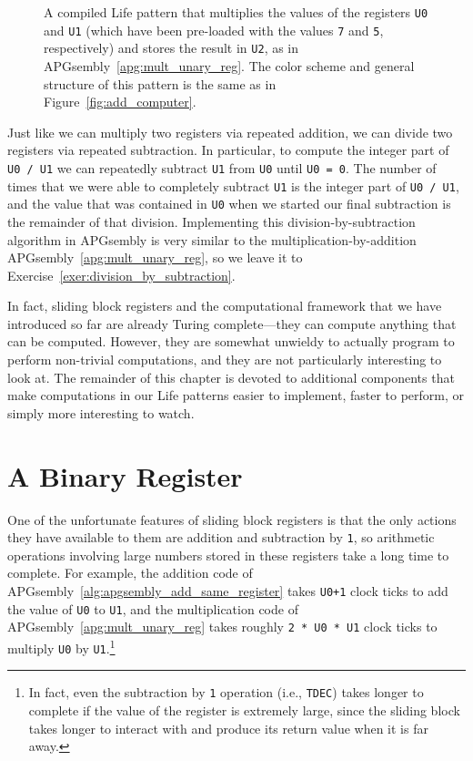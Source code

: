 \begin{figure}[!htb]
	\centering
	\caption{A compiled Life pattern that multiplies the values of the registers \texttt{U0} and \texttt{U1} (which have been pre-loaded with the values \texttt{7} and \texttt{5}, respectively) and stores the result in \texttt{U2}, as in APGsembly~\ref{apg:mult_unary_reg}. The color scheme and general structure of this pattern is the same as in Figure~\ref{fig:add_computer}.}\label{fig:mult_computer}
\end{figure}

Just like we can multiply two registers via repeated addition, we can divide two registers via repeated subtraction. In particular, to compute the integer part of \texttt{U0 / U1} we can repeatedly subtract \texttt{U1} from \texttt{U0} until \texttt{U0 = 0}. The number of times that we were able to completely subtract \texttt{U1} is the integer part of \texttt{U0 / U1}, and the value that was contained in \texttt{U0} when we started our final subtraction is the remainder of that division. Implementing this division-by-subtraction algorithm in APGsembly is very similar to the multiplication-by-addition APGsembly~\ref{apg:mult_unary_reg}, so we leave it to Exercise~\ref{exer:division_by_subtraction}.

In fact, sliding block registers and the computational framework that we have introduced so far are already Turing complete---they can compute anything that can be computed. However, they are somewhat unwieldy to actually program to perform non-trivial computations, and they are not particularly interesting to look at. The remainder of this chapter is devoted to additional components that make computations in our Life patterns easier to implement, faster to perform, or simply more interesting to watch.


\section{A Binary Register}\label{sec:binary_register}

One of the unfortunate features of sliding block registers is that the only actions they have available to them are addition and subtraction by \texttt{1}, so arithmetic operations involving large numbers stored in these registers take a long time to complete. For example, the addition code of APGsembly~\ref{alg:apgsembly_add_same_register} takes \texttt{U0+1} clock ticks to add the value of \texttt{U0} to \texttt{U1}, and the multiplication code of APGsembly~\ref{apg:mult_unary_reg} takes roughly \texttt{2 * U0 * U1} clock ticks to multiply \texttt{U0} by \texttt{U1}.\footnote{In fact, even the subtraction by \texttt{1} operation (i.e., \texttt{TDEC}) takes longer to complete if the value of the register is extremely large, since the sliding block takes longer to interact with and produce its return value when it is far away.}

